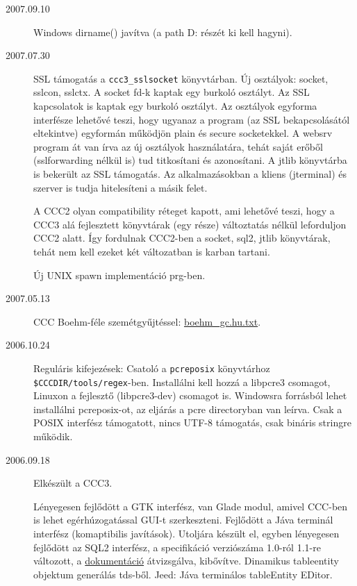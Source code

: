 \begin{description}
\item[2007.09.10]
  Windows dirname() javítva (a path D: részét ki kell hagyni).

\label{20070730}
\item[2007.07.30]
  SSL támogatás a \verb!ccc3_sslsocket! könyvtárban.
  Új osztályok: socket, sslcon, sslctx.
  A socket fd-k kaptak egy burkoló osztályt. 
  Az SSL kapcsolatok is kaptak egy burkoló osztályt.
  Az osztályok  egyforma interfésze lehetővé teszi, 
  hogy ugyanaz a program (az SSL bekapcsolásától eltekintve) 
  egyformán működjön plain és secure socketekkel.
  A websrv program át van írva az új osztályok használatára,
  tehát saját erőből (sslforwarding nélkül is) tud titkosítani és azonosítani.
  A jtlib könyvtárba is bekerült az SSL támogatás. 
  Az alkalmazásokban a kliens (jterminal) és szerver is 
  tudja hitelesíteni a másik felet.
  
  A CCC2 olyan compatibility réteget kapott, ami lehetővé teszi,
  hogy a CCC3 alá fejlesztett könyvtárak (egy része) változtatás
  nélkül leforduljon CCC2 alatt. Így fordulnak CCC2-ben 
  a socket, sql2, jtlib  könyvtárak, 
  tehát nem kell ezeket két változatban is karban tartani.

  Új UNIX spawn implementáció prg-ben.

\label{20070513}
\item[2007.05.13]
  CCC Boehm-féle szemétgyűjtéssel:  \href{boehm_gc.hu.txt}{boehm\_gc.hu.txt}.

\label{20061024}
\item[2006.10.24]
  Reguláris kifejezések: Csatoló a \verb!pcreposix! 
  könyvtárhoz \verb!$CCCDIR/tools/regex!-ben.
  Installálni kell hozzá a libpcre3 csomagot,
  Linuxon a fejlesztő (libpcre3-dev) csomagot is.
  Windowsra forrásból lehet installálni pcreposix-ot,
  az eljárás a pcre directoryban van leírva.
  Csak a POSIX interfész támogatott,
  nincs UTF-8 támogatás, 
  csak bináris stringre működik.

\label{20060918}
\item[2006.09.18]
  Elkészült a CCC3. 

  Lényegesen fejlődött a GTK interfész, van Glade modul,
  amivel CCC-ben is lehet egérhúzogatással GUI-t szerkeszteni.
  Fejlődött a Jáva terminál interfész (komaptibilis javítások).
  Utoljára készült el, egyben lényegesen fejlődött az SQL2 interfész,
  a specifikáció verziószáma 1.0-ról 1.1-re változott,   a 
  \href{sql2.html}{dokumentáció} átvizsgálva, kibővítve.
  Dinamikus tableentity objektum generálás tds-ből.
  Jeed: Jáva terminálos tableEntity EDitor.
  

\end{description}
